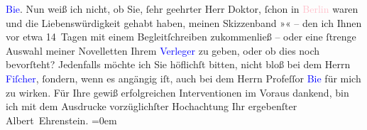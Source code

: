                         \textcolor{blue}{Bie}{}\ledrightnote{\textcolor{blue}{Oskar Bie}}.\pend
           \pstart
           Nun weiß ich nicht, ob Sie, ſehr geehrter Herr Doktor, ſchon in \textcolor{pink}{Berlin}{}\ledrightnote{\textcolor{pink}{Berlin}} waren und die Liebenswürdigkeit gehabt haben,
                    meinen Skizzenband »\label{K_L01887_1v}\label{K_L01887_1h}« – den ich
                    Ihnen vor etwa 14 Tagen mit einem Begleitſchreiben zukommenließ – oder eine
                    ſtrenge Auswahl meiner Novelletten Ihrem \textcolor{blue}{Verleger}{} zu geben, oder ob dies noch bevorſteht?\pend
           \pstart
           Jedenfalls möchte ich Sie höflichſt {\pb}bitten, nicht bloß
                    bei dem Herrn \textcolor{blue}{Fiſcher}{}\ledrightnote{\textcolor{blue}{Samuel Fischer}}, ſondern, wenn es
                    angängig iſt, auch bei dem Herrn Profeſſor \textcolor{blue}{Bie}{}\ledrightnote{\textcolor{blue}{Oskar Bie}} für mich zu wirken.\pend
           \pstart
           Für Ihre gewiß erfolgreichen Interventionen im Voraus dankend, bin ich mit dem
                    Ausdrucke vorzüglichſter Hochachtung \pend
           \pstart
           Ihr ergebenſter{\\[\baselineskip]}\spacefill\mbox{Albert Ehrenstein.}\pend
           \leftskip=0em{}\endnumbering{}  
      